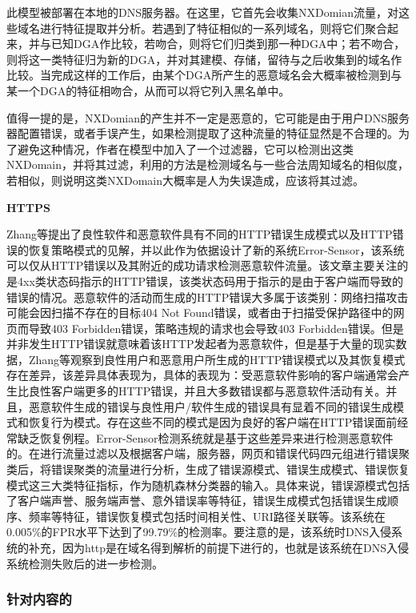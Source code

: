 \documentclass[12pt]{article} %
\begin{document}
此模型被部署在本地的DNS服务器。在这里，它首先会收集NXDomian流量，对这些域名进行特征提取并分析。若遇到了特征相似的一系列域名，则将它们聚合起来，并与已知DGA作比较，若吻合，则将它们归类到那一种DGA中；若不吻合，则将这一类特征归为新的DGA，并对其建模、存储，留待与之后收集到的域名作比较。当完成这样的工作后，由某个DGA所产生的恶意域名会大概率被检测到与某一个DGA的特征相吻合，从而可以将它列入黑名单中。

值得一提的是，NXDomian的产生并不一定是恶意的，它可能是由于用户DNS服务器配置错误，或者手误产生，如果检测提取了这种流量的特征显然是不合理的。为了避免这种情况，作者在模型中加入了一个过滤器，它可以检测出这类NXDomain，并将其过滤，利用的方法是检测域名与一些合法周知域名的相似度，若相似，则说明这类NXDomain大概率是人为失误造成，应该将其过滤。

\textbf{HTTPS}

Zhang等提出了良性软件和恶意软件具有不同的HTTP错误生成模式以及HTTP错误的恢复策略模式的见解，并以此作为依据设计了新的系统Error-Sensor，该系统可以仅从HTTP错误以及其附近的成功请求检测恶意软件流量。该文章主要关注的是4xx类状态码指示的HTTP错误，该类状态码用于指示的是由于客户端而导致的错误的情况。恶意软件的活动而生成的HTTP错误大多属于该类别：网络扫描攻击可能会因扫描不存在的目标404 Not Found错误，或者由于扫描受保护路径中的网页而导致403 Forbidden错误，策略违规的请求也会导致403 Forbidden错误。但是并非发生HTTP错误就意味着该HTTP发起者为恶意软件，但是基于大量的现实数据，Zhang等观察到良性用户和恶意用户所生成的HTTP错误模式以及其恢复模式存在差异，该差异具体表现为，具体的表现为：受恶意软件影响的客户端通常会产生比良性客户端更多的HTTP错误，并且大多数错误都与恶意软件活动有关。并且，恶意软件生成的错误与良性用户/软件生成的错误具有显着不同的错误生成模式和恢复行为模式。存在这些不同的模式是因为良好的客户端在HTTP错误面前经常缺乏恢复例程。Error-Sensor检测系统就是基于这些差异来进行检测恶意软件的。在进行流量过滤以及根据客户端，服务器，网页和错误代码四元组进行错误聚类后，将错误聚类的流量进行分析，生成了错误源模式、错误生成模式、错误恢复模式这三大类特征指标，作为随机森林分类器的输入。具体来说，错误源模式包括了客户端声誉、服务端声誉、意外错误率等特征，错误生成模式包括错误生成顺序、频率等特征，错误恢复模式包括时间相关性、URI路径关联等。该系统在0.005\%的FPR水平下达到了99.79\%的检测率。要注意的是，该系统时DNS入侵系统的补充，因为http是在域名得到解析的前提下进行的，也就是该系统在DNS入侵系统检测失败后的进一步检测。

\subsubsection{针对内容的}
\label{content}
\end{document}
